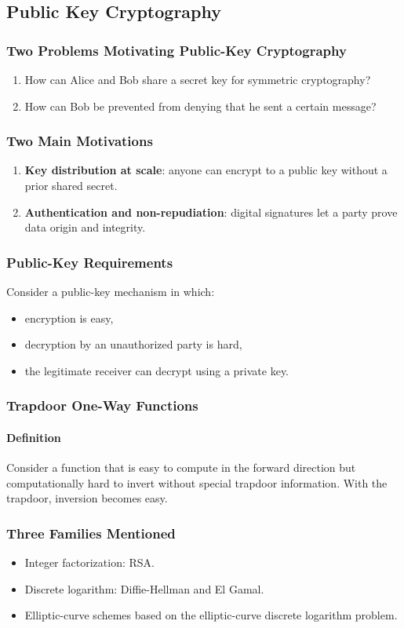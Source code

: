 \documentclass[12pt]{article}
\newcommand{\Definition}{\paragraph{Definition}}
\begin{document}
\subsection{Public Key Cryptography}
\subsubsection{Two Problems Motivating Public-Key Cryptography}
\begin{enumerate}
    \item How can Alice and Bob share a secret key for symmetric cryptography?
    \item How can Bob be prevented from denying that he sent a certain message?
\end{enumerate}

\subsubsection{Two Main Motivations}
\begin{enumerate}
    \item \textbf{Key distribution at scale}: anyone can encrypt to a public key without a prior shared secret.
    \item \textbf{Authentication and non-repudiation}: digital signatures let a party prove data origin and integrity.
\end{enumerate}

\subsubsection{Public-Key Requirements}
Consider a public-key mechanism in which:
\begin{itemize}
    \item encryption is easy,
    \item decryption by an unauthorized party is hard,
    \item the legitimate receiver can decrypt using a private key.
\end{itemize}

\subsubsection{Trapdoor One-Way Functions}
\Definition Consider a function that is easy to compute in the forward direction but computationally hard to invert without special trapdoor information. With the trapdoor, inversion becomes easy.

\subsubsection{Three Families Mentioned}
\begin{itemize}
    \item Integer factorization: RSA.
    \item Discrete logarithm: Diffie-Hellman and El Gamal.
    \item Elliptic-curve schemes based on the elliptic-curve discrete logarithm problem.
\end{itemize}
\end{document}
